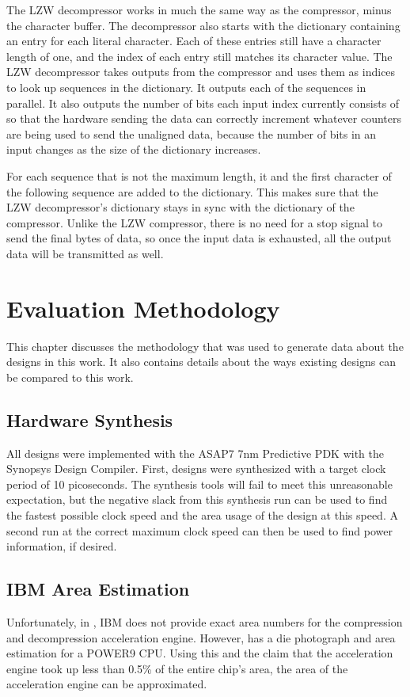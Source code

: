 \documentclass[doublespace,nopageskip]{VTthesis}
\begin{document}
The LZW decompressor works in much the same way as the compressor, minus the character buffer. The decompressor also starts with the dictionary containing an entry for each literal character. Each of these entries still have a character length of one, and the index of each entry still matches its character value. The LZW decompressor takes outputs from the compressor and uses them as indices to look up sequences in the dictionary. It outputs each of the sequences in parallel. It also outputs the number of bits each input index currently consists of so that the hardware sending the data can correctly increment whatever counters are being used to send the unaligned data, because the number of bits in an input changes as the size of the dictionary increases.

For each sequence that is not the maximum length, it and the first character of the following sequence are added to the dictionary. This makes sure that the LZW decompressor's dictionary stays in sync with the dictionary of the compressor. Unlike the LZW compressor, there is no need for a stop signal to send the final bytes of data, so once the input data is exhausted, all the output data will be transmitted as well.

\section{Evaluation Methodology}\label{se:methodology}
This chapter discusses the methodology that was used to generate data about the designs in this work. It also contains details about the ways existing designs can be compared to this work.

\subsection{Hardware Synthesis}\label{ss:hardware_synthesis}
All designs were implemented with the ASAP7 7nm Predictive PDK with the Synopsys Design Compiler. First, designs were synthesized with a target clock period of 10 picoseconds. The synthesis tools will fail to meet this unreasonable expectation, but the negative slack from this synthesis run can be used to find the fastest possible clock speed and the area usage of the design at this speed. A second run at the correct maximum clock speed can then be used to find power information, if desired.

\subsection{IBM Area Estimation}\label{ss:ibm_area_estimation}
Unfortunately, in \cite{ibm}, IBM does not provide exact area numbers for the compression and decompression acceleration engine. However, \cite{wikichip-ibm-area} has a die photograph and area estimation for a POWER9 CPU. Using this and the claim that the acceleration engine took up less than 0.5\% of the entire chip's area, the area of the acceleration engine can be approximated. 
\end{document}
